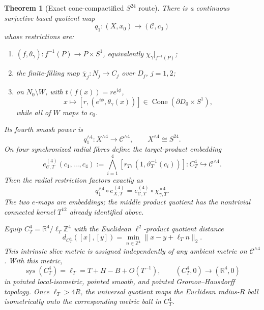 \documentclass[11pt,letterpaper]{article}
\numberwithin{equation}{section}
\newtheorem{theorem}{Theorem}[section]
\theoremstyle{definition}
\theoremstyle{remark}
\newcommand{\R}{\mathbb R}
\newcommand{\Z}{\mathbb Z}
\newcommand{\sys}{\operatorname{sys}}
\newcommand{\Cone}{\operatorname{Cone}}
\begin{document}
\begin{theorem}[Exact cone-compactified $S^{24}$ route]
\label{thm:S24-route}
There is a continuous surjective based quotient map
\begin{equation}
 q_1:(X,x_0)\longrightarrow(\mathcal C,c_0)
 \label{eq:q1}
\end{equation}
whose restrictions are:
\begin{enumerate}[label=\textup{(\roman*)}]
\item $(f,\theta_\gamma):f^{-1}(P)\to P\times S^1$, equivalently
$\chi_\gamma|_{f^{-1}(P)}$;
\item the finite-filling map $\overline\chi_j:N_j\to C_j$ over $D_j$,
$j=1,2$;
\item on $N_0\setminus W$, with $t(f(x))=re^{i\phi}$,
\begin{equation}
 x\longmapsto[r,(e^{i\phi},\theta_\gamma(x))]
 \in\Cone(\partial D_0\times S^1),
 \label{eq:q1-cusp-formula}
\end{equation}
while all of $W$ maps to $c_0$.
\end{enumerate}
Its fourth smash power is
\begin{equation}
 q_1^{\wedge4}:X^{\wedge4}\longrightarrow\mathcal C^{\wedge4},
 \qquad X^{\wedge4}\cong S^{24}.
 \label{eq:S24-map}
\end{equation}
On four synchronized radial fibres define the target-product embedding
\[
 e_{\mathcal C,T}^{(4)}(c_1,\ldots,c_4)
 :=\bigwedge_{i=1}^4
 [r_T,(1,\vartheta_T^{-1}(c_i))]:
 C_T^4\hookrightarrow\mathcal C^{\wedge4}.
\]
Then the radial restriction factors exactly as
\begin{equation}
 q_1^{\wedge4}\circ e_{X,T}^{(4)}
 =e_{\mathcal C,T}^{(4)}\circ\chi_{\gamma,T}^{\times4}.
 \label{eq:S24-fibre-map}
\end{equation}
The two \(e\)-maps are embeddings; the middle product quotient has the
nontrivial connected kernel \(T^{12}\) already identified above.

Equip \(C_T^4=\R^4/\ell_T\Z^4\) with the Euclidean \(\ell^2\)-product
quotient distance
\begin{equation}
 d_{C_T^4}([x],[y])
 =\min_{n\in\Z^4}\|x-y+\ell_Tn\|_2.
 \label{eq:C-product-metric}
\end{equation}
This intrinsic slice metric is assigned independently of any ambient
metric on \(\mathcal C^{\wedge4}\).  With this metric,
\begin{equation}
 \sys(C_T^4)=\ell_T=T+H-B+O(T^{-1}),
 \qquad (C_T^4,0)\longrightarrow(\R^4,0)
 \label{eq:S24-limit}
\end{equation}
in pointed local-isometric, pointed smooth, and pointed
Gromov--Hausdorff topology.  Once $\ell_T>4R$, the universal quotient maps
the Euclidean radius-$R$ ball isometrically onto the corresponding metric
ball in \(C_T^4\).


\end{theorem}
\end{document}
